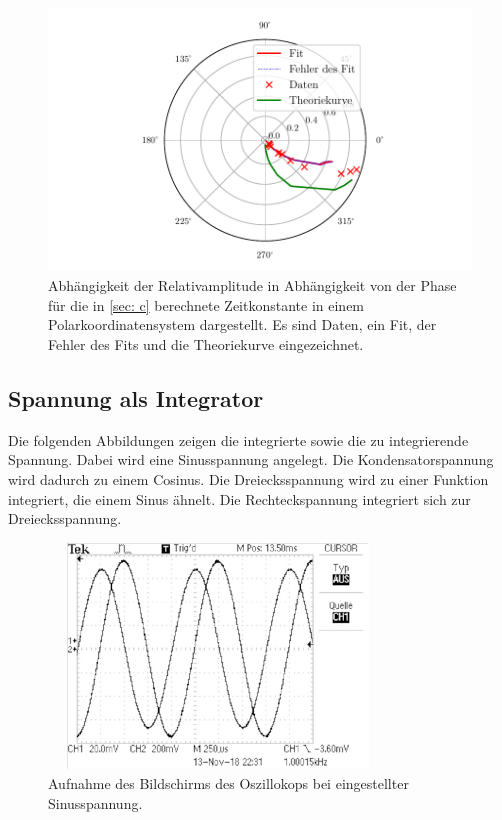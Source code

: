 \begin{figure}
  \centering
  \includegraphics[width=12cm, height=7cm]{build/plotd3.pdf}
  \caption{Abhängigkeit der Relativamplitude in Abhängigkeit von der Phase für die in \ref{sec: c} 
  berechnete Zeitkonstante in einem Polarkoordinatensystem dargestellt. Es sind Daten, ein Fit, der Fehler
  des Fits und die Theoriekurve eingezeichnet.}
  \label{fig: plotd3}
\end{figure}

\subsection{Spannung als Integrator}
Die folgenden Abbildungen zeigen die integrierte sowie die zu integrierende Spannung.
Dabei wird eine Sinusspannung angelegt. Die Kondensatorspannung wird dadurch zu einem Cosinus. Die Dreiecksspannung wird zu einer Funktion integriert, die einem Sinus ähnelt. Die Rechteckspannung integriert sich zur Dreiecksspannung. \newline \newline \newline %
\begin{figure}
  \centering
  \includegraphics[width=9cm, height=6cm]{build/integrator1.pdf}
  \caption{Aufnahme des Bildschirms des Oszillokops bei eingestellter Sinusspannung.}
  \label{fig: sinus}
\end{figure}

